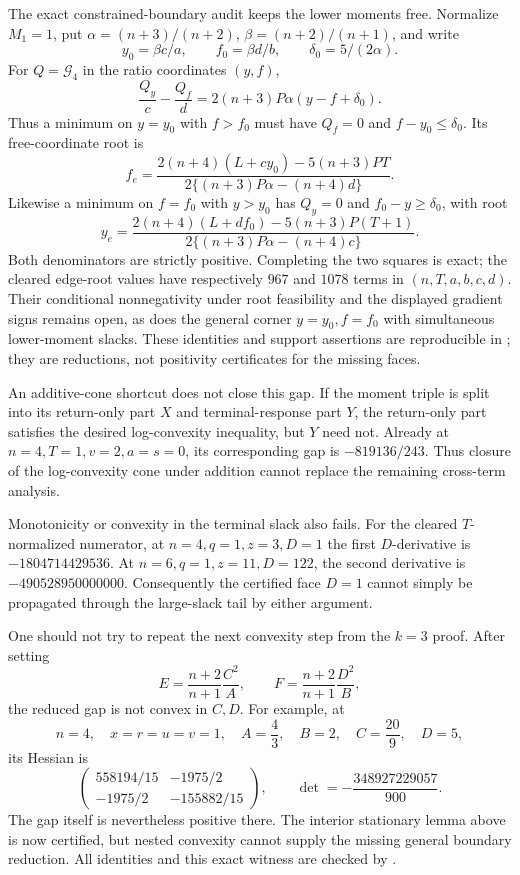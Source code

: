 \documentclass[11pt]{article}
\theoremstyle{remark}
\begin{document}
The exact constrained-boundary audit keeps the lower moments free.
Normalize $M_1=1$, put $\alpha=(n+3)/(n+2)$,
$\beta=(n+2)/(n+1)$, and write
\[
 y_0=\beta c/a,\qquad f_0=\beta d/b,\qquad
 \delta_0=5/(2\alpha).
\]
For $Q=\mathcal G_4$ in the ratio coordinates $(y,f)$,
\[
 \frac{Q_y}{c}-\frac{Q_f}{d}
     =2(n+3)P\alpha(y-f+\delta_0).
\]
Thus a minimum on $y=y_0$ with $f>f_0$ must have $Q_f=0$ and
$f-y_0\leq\delta_0$. Its free-coordinate root is
\[
 f_e=\frac{2(n+4)(L+cy_0)-5(n+3)PT}
              {2\{(n+3)P\alpha-(n+4)d\}}.
\]
Likewise a minimum on $f=f_0$ with $y>y_0$ has $Q_y=0$ and
$f_0-y\geq\delta_0$, with root
\[
 y_e=\frac{2(n+4)(L+df_0)-5(n+3)P(T+1)}
              {2\{(n+3)P\alpha-(n+4)c\}}.
\]
Both denominators are strictly positive. Completing the two squares is
exact; the cleared edge-root values have respectively $967$ and $1078$
terms in $(n,T,a,b,c,d)$. Their conditional nonnegativity under root
feasibility and the displayed gradient signs remains open, as does the
general corner $y=y_0,f=f_0$ with simultaneous lower-moment slacks.
These identities and support assertions are reproducible in
; they are reductions,
not positivity certificates for the missing faces.

An additive-cone shortcut does not close this gap.  If the moment triple is
split into its return-only part \(X\) and terminal-response part \(Y\), the
return-only part satisfies the desired log-convexity inequality, but \(Y\)
need not.  Already at \(n=4,T=1,v=2,a=s=0\), its corresponding gap is
\(-819136/243\).  Thus closure of the log-convexity cone under addition cannot
replace the remaining cross-term analysis.

Monotonicity or convexity in the terminal slack also fails.  For the cleared
\(T\)-normalized numerator, at \(n=4,q=1,z=3,D=1\) the first \(D\)-derivative
is \(-1804714429536\).  At \(n=6,q=1,z=11,D=122\), the second derivative is
\(-490528950000000\).  Consequently the certified face \(D=1\) cannot simply
be propagated through the large-slack tail by either argument.

One should not try to repeat the next convexity step from the \(k=3\) proof.
After setting
\[
 E=\frac{n+2}{n+1}\frac{C^2}{A},\qquad
 F=\frac{n+2}{n+1}\frac{D^2}{B},
\]
the reduced gap is not convex in \(C,D\).  For example, at
\[
 n=4,\quad x=r=u=v=1,\quad A=\frac43,\quad B=2,\quad
 C=\frac{20}{9},\quad D=5,
\]
its Hessian is
\[
 \begin{pmatrix}
  558194/15&-1975/2\\
  -1975/2&-155882/15
 \end{pmatrix},
 \qquad
 \det=-\frac{348927229057}{900}.
\]
The gap itself is nevertheless positive there. The interior stationary
lemma above is now certified, but nested convexity cannot supply the
missing general boundary reduction.  All identities and this exact witness are checked by
.
\end{document}
